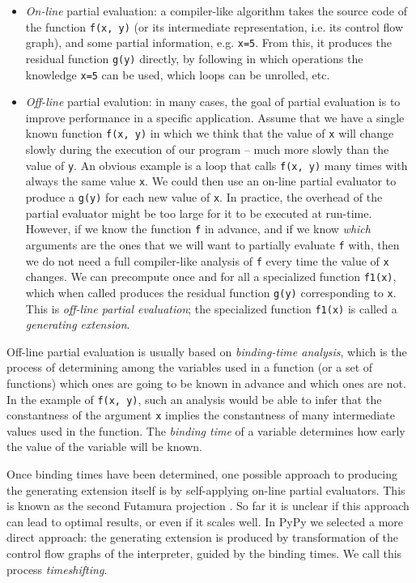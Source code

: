 \begin{itemize}
\item \emph{On-line} partial evaluation: a compiler-like algorithm takes the
source code of the function \texttt{f(x, y)} (or its intermediate representation,
i.e. its control flow graph), and some partial
information, e.g. \texttt{x=5}.  From this, it produces the residual function
\texttt{g(y)} directly, by following in which operations the knowledge \texttt{x=5} can
be used, which loops can be unrolled, etc.

\item \emph{Off-line} partial evalution: in many cases, the goal of partial
evaluation is to improve performance in a specific application.  Assume that we
have a single known function \texttt{f(x, y)} in which we think that the value
of \texttt{x} will change slowly during the execution of our program – much
more slowly than the value of \texttt{y}.  An obvious example is a loop that
calls \texttt{f(x, y)} many times with always the same value \texttt{x}.  We
could then use an on-line partial evaluator to produce a \texttt{g(y)} for each
new value of \texttt{x}.  In practice, the overhead of the partial evaluator
might be too large for it to be executed at run-time.  However, if we know the
function \texttt{f} in advance, and if we know \emph{which} arguments are the
ones that we will want to partially evaluate \texttt{f} with, then we do not
need a full compiler-like analysis of \texttt{f} every time the value of
\texttt{x} changes.  We can precompute once and for all a specialized function
\texttt{f1(x)}, which when called produces the residual function \texttt{g(y)}
corresponding to \texttt{x}.  This is \emph{off-line partial evaluation}; the
specialized function \texttt{f1(x)} is called a \emph{generating extension}.
\end{itemize}

Off-line partial evaluation is usually based on \emph{binding-time analysis}, which
is the process of determining among the variables used in a function (or
a set of functions) which ones are going to be known in advance and
which ones are not.  In the example of \texttt{f(x, y)}, such an analysis
would be able to infer that the constantness of the argument \texttt{x}
implies the constantness of many intermediate values used in the
function.  The \emph{binding time} of a variable determines how early the
value of the variable will be known.

Once binding times have been determined, one possible approach to
producing the generating extension itself is by self-applying on-line
partial evaluators.  This is known as the second Futamura projection
\cite{Futamura99}.  So far it is unclear if this approach can lead to optimal
results, or even if it scales well.  In PyPy we selected a more direct
approach: the generating extension is produced by transformation of the
control flow graphs of the interpreter, guided by the binding times.  We
call this process \emph{timeshifting}.

